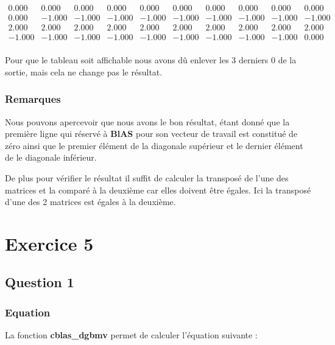 \documentclass[11pt]{article}
\begin{document}
\begin{equation*}
  \begin{array}{rrrrrrrrrr}
    0.000 &	0.000 &	0.000 &	0.000 &
    0.000 &	0.000 &	0.000 &	0.000 &
    0.000 &	0.000 \\	
    0.000 &	-1.000 &	-1.000 &	-1.000 &
    -1.000 &	-1.000 &	-1.000 &	-1.000 &
    -1.000 &	-1.000 \\
    2.000 &	2.000 &	2.000 &	2.000 &
    2.000 &	2.000 &	2.000 &	2.000 &
    2.000 &	2.000 \\	
    -1.000 &	-1.000 &	-1.000 &	-1.000 &
    -1.000 &	-1.000 &	-1.000 &	-1.000 &
    -1.000 &	0.000 \\
  \end{array}
\end{equation*}

Pour que le tableau soit affichable nous avons dû enlever les 3
derniers 0 de la sortie, mais cela ne change pas le résultat.

\subsubsection{Remarques}

Nous pouvons apercevoir que nous avons le bon résultat, étant donné
que la première ligne qui réservé à \textbf{BlAS} pour son vecteur de
travail est constitué de zéro ainsi que le premier élément de la
diagonale supérieur et le dernier élément de le diagonale
inférieur.\newline

De plus pour vérifier le résultat il suffit de calculer la transposé
de l'une des matrices et la comparé à la deuxième car elles doivent
être égales. Ici la transposé d'une des 2 matrices est égales à la
deuxième.

\section{Exercice 5}

\subsection{Question 1}

\subsubsection{Equation}

La fonction \textbf{cblas\_dgbmv} permet de calculer l'équation
suivante :
\end{document}
